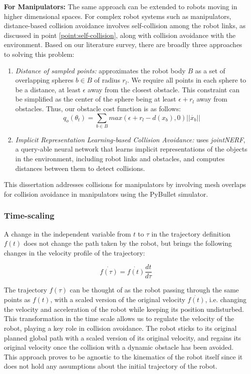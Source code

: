 \textbf{For Manipulators:}
The same approach can be extended to robots moving in higher dimensional spaces. For complex robot systems such as manipulators, distance-based collision avoidance involves self-collision among the robot links, as discussed in point \ref{point:self-collision}, along with collision avoidance with the environment. Based on our literature survey, there are broadly three approaches to solving this problem:
\begin{enumerate}
    \item \label{point: SDF} \textit{Distance of sampled points:} \cite{STOMP} approximates the robot body $B$ as a set of overlapping spheres $b \in B$ of radius $r_l$. We require all points in each sphere to be a distance, at least $\epsilon$ away from the closest obstacle. This constraint can be simplified as the center of the sphere being at least $\epsilon + r_l$ away from obstacles. Thus, our obstacle cost function is as follows:
    \begin{equation}
        q_o(\theta_t) = \sum_{b \in B}{max(\epsilon+r_l - d(x_b),0)||\dot{x_b}||}
    \end{equation}
    
    \item \textit{Implicit Representation Learning-based Collision Avoidance:} \cite{STORM} uses \textit{jointNERF}, a query-able neural network that learns implicit representations of the objects in the environment, including robot links and obstacles, and computes distances between them to detect collisions. 
    
 
\end{enumerate}

This dissertation addresses collisions for manipulators by involving mesh overlaps for collision avoidance in manipulators using the PyBullet simulator. 

\subsubsection{Time-scaling}

A change in the independent variable from $t$ to $\tau$ in the trajectory definition $f(t)$ does not change the path taken by the robot, but brings the following changes in the velocity profile of the trajectory:

\begin{equation}
    \dot{f(\tau)} = \dot{f(t)}\frac{dt}{d\tau}
\end{equation}

The trajectory $f(\tau)$ can be thought of as the robot passing through the same points as $f(t)$, with a scaled version of the original velocity $\dot{f(t)}$, i.e. changing the velocity and acceleration of the robot while keeping its position undisturbed. This transformation in the time scale allows us to regulate the velocity of the robot, playing a key role in collision avoidance. The robot sticks to its original planned global path with a scaled version of its original velocity, and regains its original velocity once the collision with a dynamic obstacle has been avoided. This approach proves to be agnostic to the kinematics of the robot itself since it does not hold any assumptions about the initial trajectory of the robot.

